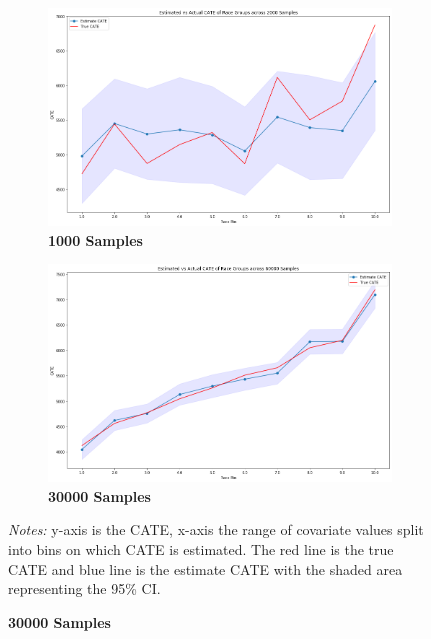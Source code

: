 \documentclass[12pt]{article}
\begin{document}
\begin{figure}[!htp]
\caption{\label{figure:four}Estimated vs. Actual CATE across Race Groups}
	\centering
	\begin{subfigure} [h] {0.49\linewidth}
		\caption{\textbf{1000 Samples}}
   	 	\includegraphics[width = \linewidth]{Graphs/s2_race2000.png}
	\end{subfigure}
	\begin{subfigure} [h] {0.49\linewidth}
		\caption{\textbf{30000 Samples}}
   	 	\includegraphics[width = \linewidth]{Graphs/s2_race60000.png}
	\end{subfigure}
\footnotesize
\emph{Notes:}  y-axis is the CATE, x-axis the range of covariate values split into bins on which CATE is estimated. The red line is the true CATE and blue line is the estimate CATE with the shaded area representing the 95\% CI.
\end{figure} 
\end{document}
